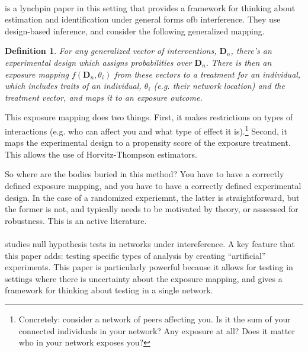\documentclass{tufte-handout}
\theoremstyle{break}
\newtheorem{defN}{Definition}
\begin{document}
\paragraph{\citet{aronow2017estimating}} is a lynchpin paper in this setting that provides a framework for thinking about estimation and identification under general forms ofb interference. They use design-based inference, and consider the following generalized mapping.

\begin{defN}
  For any generalized vector of interventions, $\mathbf{D}_{n}$, there's an experimental design which assigns probabilities over $\mathbf{D}_{n}$. There is then an \emph{exposure} mapping $f(\mathbf{D}_{n}, \theta_{i})$ from these vectors to a treatment for an individual, which includes traits of an individual, $\theta_{i}$ (e.g. their network location) and the treatment vector, and maps it to an exposure outcome.
\end{defN}

This exposure mapping does two things. First, it makes restrictions on types of interactions (e.g. who can affect you and what type of effect it is).\footnote{Concretely: consider a network of peers affecting you. Is it the sum of your connected individuals in your network? Any exposure at all? Does it matter who in your network exposes you?} Second, it maps the experimental design to a propensity score of the exposure treatment. This allows the use of Horvitz-Thompson estimators.

So where are the bodies buried in this method? You have to have a correctly defined exposure mapping, and you have to have a correctly defined experimental design. In the case of a randomized experiemnt, the latter is straightforward, but the former is not, and typically needs to be motivated by theory, or asssessed for robustness. This is an active literature.

\paragraph{\citet{athey2018exact}} studies null hypothesis tests in networks under intereference. A key feature that this paper adds: testing specific types of analysis by creating ``artificial'' experiments. This paper is particularly powerful because it allows for testing in settings where there is uncertainty about the exposure mapping, and gives a framework for thinking about testing in a single network. 
\end{document}
